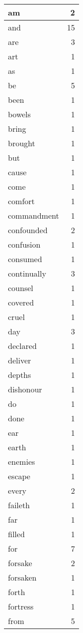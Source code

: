 \begin{center}
\begin{longtable}{l|r}
am & 2 \\ \hline
and & 15 \\ \hline
are & 3 \\ \hline
art & 1 \\ \hline
as & 1 \\ \hline
be & 5 \\ \hline
been & 1 \\ \hline
bowels & 1 \\ \hline
bring & 1 \\ \hline
brought & 1 \\ \hline
but & 1 \\ \hline
cause & 1 \\ \hline
come & 1 \\ \hline
comfort & 1 \\ \hline
commandment & 1 \\ \hline
confounded & 2 \\ \hline
confusion & 1 \\ \hline
consumed & 1 \\ \hline
continually & 3 \\ \hline
counsel & 1 \\ \hline
covered & 1 \\ \hline
cruel & 1 \\ \hline
day & 3 \\ \hline
declared & 1 \\ \hline
deliver & 1 \\ \hline
depths & 1 \\ \hline
dishonour & 1 \\ \hline
do & 1 \\ \hline
done & 1 \\ \hline
ear & 1 \\ \hline
earth & 1 \\ \hline
enemies & 1 \\ \hline
escape & 1 \\ \hline
every & 2 \\ \hline
faileth & 1 \\ \hline
far & 1 \\ \hline
filled & 1 \\ \hline
for & 7 \\ \hline
forsake & 2 \\ \hline
forsaken & 1 \\ \hline
forth & 1 \\ \hline
fortress & 1 \\ \hline
from & 5 \\ \hline

\end{longtable}
\end{center}
